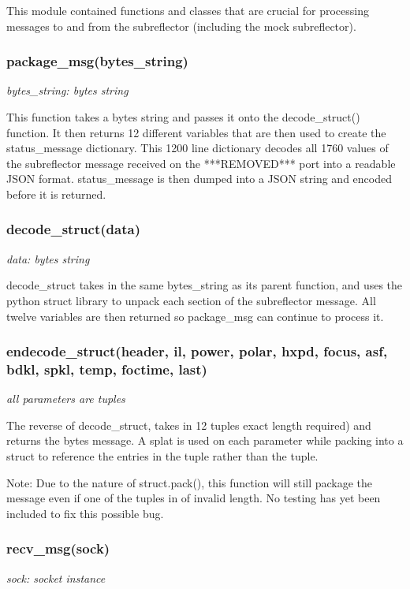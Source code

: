 \documentclass{article}
\begin{document}
This module contained functions and classes that are crucial for processing messages to and from the subreflector (including the mock subreflector).
 
\subsubsection{package\_msg(bytes\_string)}
\emph{bytes\_string: bytes string}
\vspace{10pt}

This function takes a bytes string and passes it onto the decode\_struct() function. It then returns 12 different variables that are then used to create the status\_message dictionary. This 1200 line dictionary decodes all 1760  values of the subreflector message received on the ***REMOVED*** port into a readable JSON format. status\_message is then dumped into a JSON string and encoded before it is returned.

\subsubsection{decode\_struct(data)}
\emph{data: bytes string}
\vspace{10pt}

decode\_struct takes in the same bytes\_string as its parent function, and uses the python struct library to unpack each section of the subreflector message. All twelve variables are then returned so package\_msg can continue to process it.

\subsubsection{endecode\_struct(header, il, power, polar, hxpd, focus, asf, bdkl, spkl, temp, foctime, last)}
\emph{all parameters are tuples}
\vspace{10pt}

The reverse of decode\_struct, takes in 12 tuples exact length required) and returns the bytes message. A splat is used on each parameter while packing into a struct to reference the entries in the tuple rather than the tuple. 
\vspace{5pt}

Note: Due to the nature of struct.pack(), this function will still package the message even if one of the tuples in of invalid length. No testing has yet been included to fix this possible bug. 

\subsubsection{recv\_msg(sock)}
\emph{sock: socket instance}
\vspace{10pt}
\end{document}
